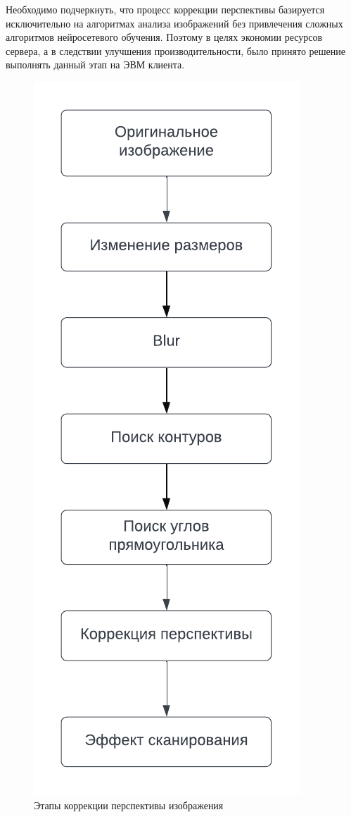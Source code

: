 Необходимо подчеркнуть, что процесс коррекции перспективы базируется исключительно на алгоритмах анализа изображений без привлечения сложных алгоритмов нейросетевого обучения.
Поэтому в целях экономии ресурсов сервера, а в следствии улучшения производительности, было принято решение выполнять данный этап на ЭВМ клиента.
\begin{figure}
    \includegraphics[scale=0.75]{img/perspective_correction.png}
    \caption{Этапы коррекции перспективы изображения}
    \label{perspective_correction_algo}
\end{figure}

